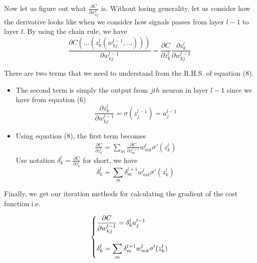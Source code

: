 \documentclass[12pt, oneside]{article}
\begin{document}
Now let us figure out what $\frac{\partial C}{\partial w_{kj}^L}$ is. Without losing generality, let us consider how the derivative looks like when we consider how signals passes from layer $l-1$ to layer $l$. By using the chain rule, we have 
\begin{equation}
\frac{\partial C(...(z^l_k(w_{kj}^{l-1},...)))}{\partial w_{kj}^{l-1}}
=\frac{\partial C}{\partial z_k^l}\frac{\partial z_k^l}{\partial w_{kj}^{l-1}}
\end{equation}

There are two terms that we need to understand from the R.H.S. of equation (8).

\begin{itemize}
\item The second term is simply the output from $jth$ neuron in layer $l-1$ since we have from equation (6)
\begin{equation}
\frac{\partial z_k^l}{\partial w_{kj}^{l-1}}=\sigma({z^{l-1}_j})=a^{l-1}_j
\end{equation}

\item Using equation (8), the first term becomes 
\begin{align*}
\frac{\partial C}{\partial z_k^l}=\sum_m \frac{\partial C}{\partial z_m^{l+1}} w^l_{mk}\sigma'(z_k^l)
\end{align*}
Use notation $\delta^l_k=\frac{\partial C}{\partial z_k^l}$ for short, we have
\begin{equation}
\delta^l_k=\sum_m \delta^{l+1}_m w^l_{mk}\sigma'(z_k^l)
\end{equation}


\end{itemize}


Finally, we get our iteration methods for calculating the gradient of the cost function i.e.

\begin{equation}
\begin{dcases}
\frac{\partial C}{\partial w_{kj}^{l-1}}=\delta_k^{l}a_j^{l-1}\\[10pt]
\delta_k^{l}={\sum_m \delta^{l+1}_m w^l_{mk}\sigma'(z_k^l)}
\end{dcases}
\end{equation}
\end{document}
